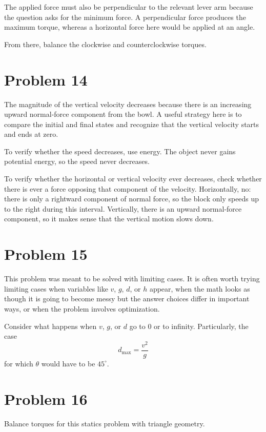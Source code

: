 \documentclass[11pt]{article}
\begin{document}
The applied force must also be perpendicular to the relevant lever arm because the question asks for the minimum force. A perpendicular force produces the maximum torque, whereas a horizontal force here would be applied at an angle.

From there, balance the clockwise and counterclockwise torques.

\section*{Problem 14}
\hspace*{\parindent} The magnitude of the vertical velocity decreases because there is an increasing upward normal-force component from the bowl. A useful strategy here is to compare the initial and final states and recognize that the vertical velocity starts and ends at zero.

To verify whether the speed decreases, use energy. The object never gains potential energy, so the speed never decreases.

To verify whether the horizontal or vertical velocity ever decreases, check whether there is ever a force opposing that component of the velocity. Horizontally, no: there is only a rightward component of normal force, so the block only speeds up to the right during this interval. Vertically, there is an upward normal-force component, so it makes sense that the vertical motion slows down.

\section*{Problem 15}
\hspace*{\parindent} This problem was meant to be solved with limiting cases. It is often worth trying limiting cases when variables like $v$, $g$, $d$, or $h$ appear, when the math looks as though it is going to become messy but the answer choices differ in important ways, or when the problem involves optimization.

Consider what happens when $v$, $g$, or $d$ go to $0$ or to infinity. Particularly, the case
\[
d_{\max}=\frac{v^2}{g}
\]
for which $\theta$ would have to be $45^\circ$.

\section*{Problem 16}
Balance torques for this statics problem with triangle geometry.
\end{document}
